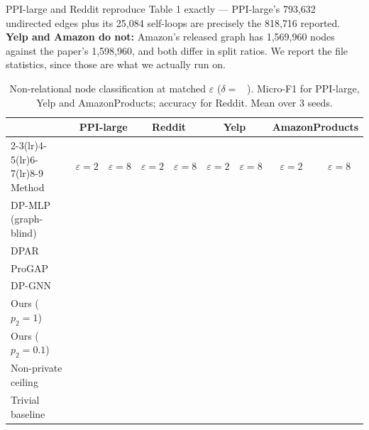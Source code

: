 \documentclass[11pt]{article}
\begin{document}
\noindent PPI-large and Reddit reproduce Table 1 exactly --- PPI-large's
793{,}632 undirected edges plus its 25{,}084 self-loops are precisely the
818{,}716 reported. \textbf{Yelp and Amazon do not:} Amazon's released graph has
1{,}569{,}960 nodes against the paper's 1{,}598{,}960, and both differ in split
ratios. We report the file statistics, since those are what we actually run on.



\begin{table}[H]
\centering\small
\caption{Non-relational node classification at matched $\varepsilon$
($\delta = $ \ ). Micro-F1 for PPI-large, Yelp and AmazonProducts; accuracy for
Reddit. Mean over 3 seeds.}
\label{tab:main-nonrel}
\begin{tabular}{lcccccccc}
\toprule
& \multicolumn{2}{c}{PPI-large} & \multicolumn{2}{c}{Reddit}
& \multicolumn{2}{c}{Yelp} & \multicolumn{2}{c}{AmazonProducts}\\
\cmidrule(lr){2-3}\cmidrule(lr){4-5}\cmidrule(lr){6-7}\cmidrule(lr){8-9}
Method & $\varepsilon{=}2$ & $\varepsilon{=}8$ & $\varepsilon{=}2$ & $\varepsilon{=}8$
       & $\varepsilon{=}2$ & $\varepsilon{=}8$ & $\varepsilon{=}2$ & $\varepsilon{=}8$\\
\midrule
DP-MLP (graph-blind)     & & & & & & & & \\
DPAR                     & & & & & & & & \\
ProGAP                   & & & & & & & & \\
DP-GNN                   & & & & & & & & \\
Ours ($p_2{=}1$)         & & & & & & & & \\
Ours ($p_2{=}0.1$)       & & & & & & & & \\
\midrule
Non-private ceiling & \multicolumn{2}{c}{} & \multicolumn{2}{c}{} & \multicolumn{2}{c}{} & \multicolumn{2}{c}{}\\
Trivial baseline    & \multicolumn{2}{c}{} & \multicolumn{2}{c}{} & \multicolumn{2}{c}{} & \multicolumn{2}{c}{}\\
\bottomrule
\end{tabular}
\end{table}
\end{document}
